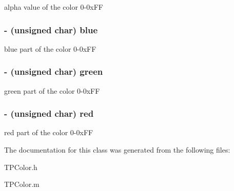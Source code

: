 alpha value of the color 0-0xFF \hypertarget{interface_t_p_color_ab1912bec2407a73f0c27f3ba9a203d3}{
\subsubsection[{blue}]{\setlength{\rightskip}{0pt plus 5cm}- (unsigned char) blue}}
\label{interface_t_p_color_ab1912bec2407a73f0c27f3ba9a203d3}


blue part of the color 0-0xFF \hypertarget{interface_t_p_color_865eef9925aefb84be7b634757f1becb}{
\subsubsection[{green}]{\setlength{\rightskip}{0pt plus 5cm}- (unsigned char) green}}
\label{interface_t_p_color_865eef9925aefb84be7b634757f1becb}


green part of the color 0-0xFF \hypertarget{interface_t_p_color_5b284d282ceddcbf24e37bb2bac9b217}{
\subsubsection[{red}]{\setlength{\rightskip}{0pt plus 5cm}- (unsigned char) red}}
\label{interface_t_p_color_5b284d282ceddcbf24e37bb2bac9b217}


red part of the color 0-0xFF 

The documentation for this class was generated from the following files:\begin{CompactItemize}
\item 
TPColor.h\item 
TPColor.m\end{CompactItemize}
